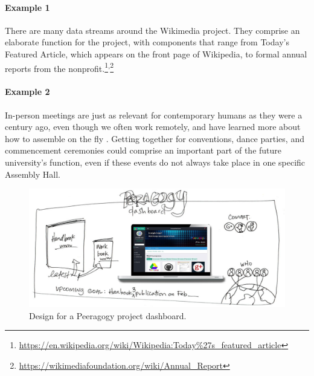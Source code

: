 \begin{refsection}
\paragraph{Example 1} 
There are many data streams around the Wikimedia project.  They comprise an elaborate  function for the project, with components that range from Today's Featured Article, which appears on the front page of Wikipedia, to formal annual reports from the nonprofit.\footnote{\url{https://en.wikipedia.org/wiki/Wikipedia:Today\%27s_featured_article}}\textsuperscript{,}\footnote{\url{https://wikimediafoundation.org/wiki/Annual_Report}}


\paragraph{Example 2} In-person meetings are just as relevant for contemporary humans as they were a century ago, even though we often work remotely, and have learned more about how to assemble on the fly \cite{rheingold2007smart}.  Getting together for conventions, dance parties, and commencement ceremonies could comprise an important part of the future university's  function, even if these events do not always take place in one specific Assembly Hall.


\begin{figure}[t]
\includegraphics[width=\textwidth]{dashboard_design.jpg}
\caption{Design for a Peeragogy project dashboard.\label{dashboard}}
\end{figure}


\end{refsection}
